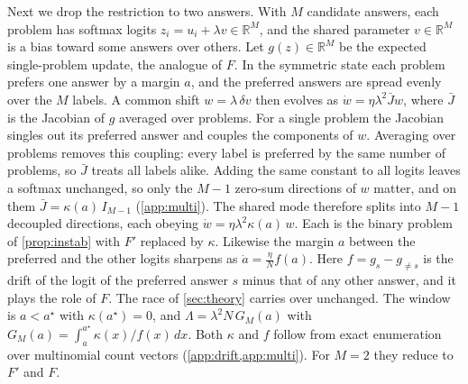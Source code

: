 Next we drop the restriction to two answers.
With $M$ candidate answers, each problem has softmax logits $z_i=u_i+\lambda v\in\mathbb R^M$, and the shared parameter $v\in\mathbb R^M$ is a bias toward some answers over others.
Let $g(z)\in\mathbb R^M$ be the expected single-problem update, the analogue of $F$.
In the symmetric state each problem prefers one answer by a margin $a$, and the preferred answers are spread evenly over the $M$ labels.
A common shift $w=\lambda\,\delta v$ then evolves as $\dot w=\eta\lambda^2\bar Jw$, where $\bar J$ is the Jacobian of $g$ averaged over problems.
For a single problem the Jacobian singles out its preferred answer and couples the components of $w$.
Averaging over problems removes this coupling: every label is preferred by the same number of problems, so $\bar J$ treats all labels alike.
Adding the same constant to all logits leaves a softmax unchanged, so only the $M-1$ zero-sum directions of $w$ matter, and on them $\bar J=\kappa(a)\,I_{M-1}$ (\cref{app:multi}).
The shared mode therefore splits into $M-1$ decoupled directions, each obeying $\dot w=\eta\lambda^2\kappa(a)\,w$.
Each is the binary problem of \cref{prop:instab} with $F'$ replaced by $\kappa$.
Likewise the margin $a$ between the preferred and the other logits sharpens as $\dot a=\frac\eta Nf(a)$. Here $f=g_s-g_{\neq s}$ is the drift of the logit of the preferred answer $s$ minus that of any other answer, and it plays the role of $F$.
The race of \cref{sec:theory} carries over unchanged. The window is $a<a^\star$ with $\kappa(a^\star)=0$, and $\Lambda=\lambda^2N\,G_M(a)$ with $G_M(a)=\int_a^{a^\star}\kappa(x)/f(x)\,dx$.
Both $\kappa$ and $f$ follow from exact enumeration over multinomial count vectors (\cref{app:drift,app:multi}). For $M=2$ they reduce to $F'$ and $F$.

